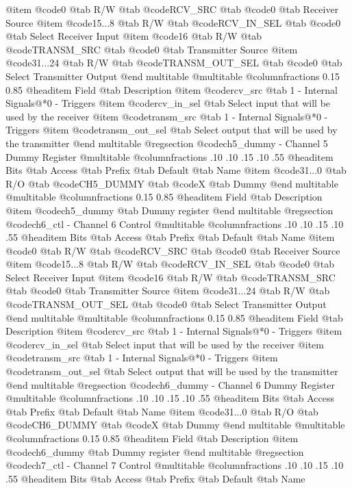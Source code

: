 @item @code{0}
@tab R/W @tab
@code{RCV_SRC}
@tab @code{0} @tab 
Receiver Source
@item @code{15...8}
@tab R/W @tab
@code{RCV_IN_SEL}
@tab @code{0} @tab 
Select Receiver Input
@item @code{16}
@tab R/W @tab
@code{TRANSM_SRC}
@tab @code{0} @tab 
Transmitter Source
@item @code{31...24}
@tab R/W @tab
@code{TRANSM_OUT_SEL}
@tab @code{0} @tab 
Select Transmitter Output
@end multitable
@multitable @columnfractions 0.15 0.85
@headitem Field @tab Description
@item @code{rcv_src} @tab 1 - Internal Signals@*0 - Triggers
@item @code{rcv_in_sel} @tab Select input that will be used by the receiver
@item @code{transm_src} @tab 1 - Internal Signals@*0 - Triggers
@item @code{transm_out_sel} @tab Select output that will be used by the transmitter
@end multitable
@regsection @code{ch5_dummy} - Channel 5 Dummy Register
@multitable @columnfractions .10 .10 .15 .10 .55
@headitem Bits @tab Access @tab Prefix @tab Default @tab Name
@item @code{31...0}
@tab R/O @tab
@code{CH5_DUMMY}
@tab @code{X} @tab 
Dummy
@end multitable
@multitable @columnfractions 0.15 0.85
@headitem Field @tab Description
@item @code{ch5_dummy} @tab Dummy register
@end multitable
@regsection @code{ch6_ctl} - Channel 6 Control
@multitable @columnfractions .10 .10 .15 .10 .55
@headitem Bits @tab Access @tab Prefix @tab Default @tab Name
@item @code{0}
@tab R/W @tab
@code{RCV_SRC}
@tab @code{0} @tab 
Receiver Source
@item @code{15...8}
@tab R/W @tab
@code{RCV_IN_SEL}
@tab @code{0} @tab 
Select Receiver Input
@item @code{16}
@tab R/W @tab
@code{TRANSM_SRC}
@tab @code{0} @tab 
Transmitter Source
@item @code{31...24}
@tab R/W @tab
@code{TRANSM_OUT_SEL}
@tab @code{0} @tab 
Select Transmitter Output
@end multitable
@multitable @columnfractions 0.15 0.85
@headitem Field @tab Description
@item @code{rcv_src} @tab 1 - Internal Signals@*0 - Triggers
@item @code{rcv_in_sel} @tab Select input that will be used by the receiver
@item @code{transm_src} @tab 1 - Internal Signals@*0 - Triggers
@item @code{transm_out_sel} @tab Select output that will be used by the transmitter
@end multitable
@regsection @code{ch6_dummy} - Channel 6 Dummy Register
@multitable @columnfractions .10 .10 .15 .10 .55
@headitem Bits @tab Access @tab Prefix @tab Default @tab Name
@item @code{31...0}
@tab R/O @tab
@code{CH6_DUMMY}
@tab @code{X} @tab 
Dummy
@end multitable
@multitable @columnfractions 0.15 0.85
@headitem Field @tab Description
@item @code{ch6_dummy} @tab Dummy register
@end multitable
@regsection @code{ch7_ctl} - Channel 7 Control
@multitable @columnfractions .10 .10 .15 .10 .55
@headitem Bits @tab Access @tab Prefix @tab Default @tab Name

